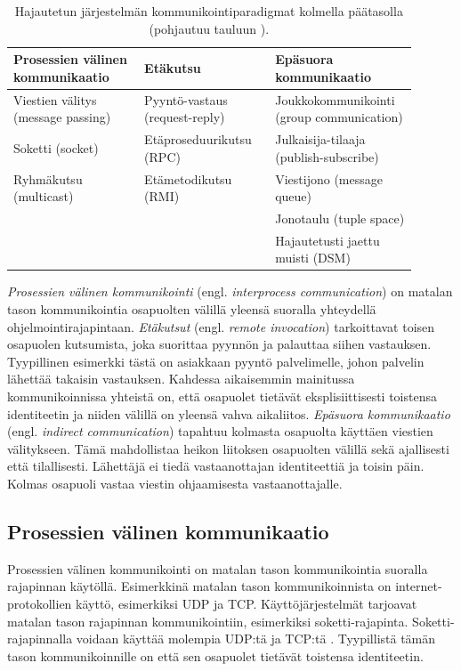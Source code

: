 \begin{table}[ht!]
	\caption{Hajautetun järjestelmän kommunikointiparadigmat kolmella päätasolla (pohjautuu tauluun \mbox{\cite[s.~46]{distributed-systems-concepts-and-design}}).}
	\label{tab:communication-paradigms}
	\begin{tabular}{p{0.3\linewidth} | p{0.3\linewidth} | p{0.3\linewidth}}
		\hline
		\textbf{Prosessien välinen kommunikaatio} & \textbf{Etäkutsu} & \textbf{Epäsuora kommunikaatio} \\
		\hline \hline
		Viestien välitys (message passing) & Pyyntö-vastaus (request-reply) & Joukkokommunikointi (group communication) \\
		\hline
		Soketti (socket) & Etäproseduurikutsu (RPC) & Julkaisija-tilaaja (publish-subscribe) \\
		\hline
		Ryhmäkutsu (multicast) & Etämetodikutsu (RMI) & Viestijono (message queue) \\
		\hline
		& & Jonotaulu (tuple space) \\
		\hline
		& & Hajautetusti jaettu muisti (DSM) \\
		\hline
	\end{tabular}
\end{table}

\emph{Prosessien välinen kommunikointi} (engl. \emph{interprocess communication}) on matalan tason kommunikointia osapuolten välillä yleensä suoralla yhteydellä ohjelmointirajapintaan. \emph{Etäkutsut} (engl. \emph{remote invocation}) tarkoittavat toisen osapuolen kutsumista, joka suorittaa pyynnön ja palauttaa siihen vastauksen. Tyypillinen esimerkki tästä on asiakkaan pyyntö palvelimelle, johon palvelin lähettää takaisin vastauksen. Kahdessa aikaisemmin mainitussa kommunikoinnissa yhteistä on, että osapuolet tietävät eksplisiittisesti toistensa identiteetin ja niiden välillä on yleensä vahva aikaliitos. \emph{Epäsuora kommunikaatio} (engl. \emph{indirect communication}) tapahtuu kolmasta osapuolta käyttäen viestien välitykseen. Tämä mahdollistaa heikon liitoksen osapuolten välillä sekä ajallisesti että tilallisesti. Lähettäjä ei tiedä vastaanottajan identiteettiä ja toisin päin. Kolmas osapuoli vastaa viestin ohjaamisesta vastaanottajalle. \mbox{\cite[s.~43--45]{distributed-systems-concepts-and-design}}


\subsection{Prosessien välinen kommunikaatio}
\label{ch:interprocess-communication}
Prosessien välinen kommunikointi on matalan tason kommunikointia suoralla rajapinnan käytöllä. Esimerkkinä matalan tason kommunikoinnista on internet-protokollien käyttö, esimerkiksi UDP ja TCP. Käyttöjärjestelmät tarjoavat matalan tason rajapinnan kommunikointiin, esimerkiksi soketti-rajapinta. Soketti-rajapinnalla voidaan käyttää molempia UDP:tä ja TCP:tä \cite[s.~1152]{linux-programming-interface}. Tyypillistä tämän tason kommunikoinnille on että sen osapuolet tietävät toistensa identiteetin.


